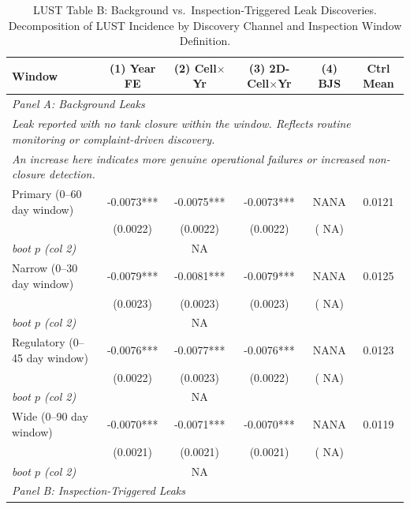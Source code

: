 \begin{table}[htbp]
\centering
\caption{LUST Table B: Background vs.\ Inspection-Triggered Leak Discoveries. Decomposition of LUST Incidence by Discovery Channel and Inspection Window Definition.}
\label{tab:lust_b_decomp}
\begin{tabular}{lccccc}
\toprule
Window & (1) Year FE & (2) Cell$\times$Yr & (3) 2D-Cell$\times$Yr & (4) BJS & Ctrl Mean \\
\midrule
\multicolumn{6}{l}{\textit{Panel A: Background Leaks}} \\
\multicolumn{6}{l}{\small\textit{Leak reported with no tank closure within the window. Reflects routine monitoring or complaint-driven discovery. }} \\
\multicolumn{6}{l}{\small\textit{An increase here indicates more genuine operational failures or increased non-closure detection.}} \\[0.3em]
Primary (0--60 day window) & -0.0073*** & -0.0075*** & -0.0073*** &    NANA & 0.0121 \\
 & (0.0022) & (0.0022) & (0.0022) & (   NA) &  \\
 \hspace{0.5em}\textit{boot $p$ (col 2)} & &   NA & \multicolumn{2}{c}{} &  \\[0.2em]
Narrow (0--30 day window) & -0.0079*** & -0.0081*** & -0.0079*** &    NANA & 0.0125 \\
 & (0.0023) & (0.0023) & (0.0023) & (   NA) &  \\
 \hspace{0.5em}\textit{boot $p$ (col 2)} & &   NA & \multicolumn{2}{c}{} &  \\[0.2em]
Regulatory (0--45 day window) & -0.0076*** & -0.0077*** & -0.0076*** &    NANA & 0.0123 \\
 & (0.0022) & (0.0023) & (0.0022) & (   NA) &  \\
 \hspace{0.5em}\textit{boot $p$ (col 2)} & &   NA & \multicolumn{2}{c}{} &  \\[0.2em]
Wide (0--90 day window) & -0.0070*** & -0.0071*** & -0.0070*** &    NANA & 0.0119 \\
 & (0.0021) & (0.0021) & (0.0021) & (   NA) &  \\
 \hspace{0.5em}\textit{boot $p$ (col 2)} & &   NA & \multicolumn{2}{c}{} &  \\[0.2em]
\midrule
\multicolumn{6}{l}{\textit{Panel B: Inspection-Triggered Leaks}} \\

\end{tabular}
\end{table}

